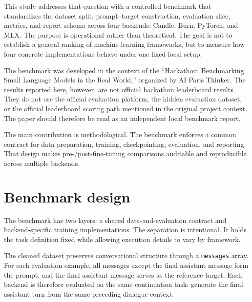 \documentclass[11pt]{article}
\begin{document}
This study addresses that question with a controlled benchmark that standardizes the dataset split, prompt--target construction, evaluation slice, metrics, and report schema across four backends: Candle, Burn, PyTorch, and MLX. The purpose is operational rather than theoretical. The goal is not to establish a general ranking of machine-learning frameworks, but to measure how four concrete implementations behave under one fixed local setup.

The benchmark was developed in the context of the ``Hackathon: Benchmarking Small Language Models in the Real World,'' organized by AI Paris Thinker. The results reported here, however, are not official hackathon leaderboard results. They do not use the official evaluation platform, the hidden evaluation dataset, or the official leaderboard scoring path mentioned in the original project context. The paper should therefore be read as an independent local benchmark report.

The main contribution is methodological. The benchmark enforces a common contract for data preparation, training, checkpointing, evaluation, and reporting. That design makes pre-/post-fine-tuning comparisons auditable and reproducible across multiple backends.

\section{Benchmark design}

The benchmark has two layers: a shared data-and-evaluation contract and backend-specific training implementations. The separation is intentional. It holds the task definition fixed while allowing execution details to vary by framework.

\begin{center}
\end{center}

The cleaned dataset preserves conversational structure through a \texttt{messages} array. For each evaluation example, all messages except the final assistant message form the prompt, and the final assistant message serves as the reference target. Each backend is therefore evaluated on the same continuation task: generate the final assistant turn from the same preceding dialogue context.
\end{document}
